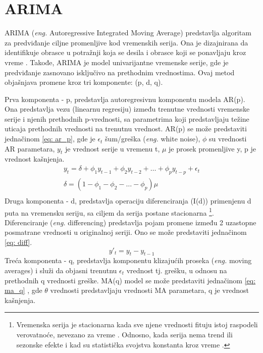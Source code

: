 \documentclass[12pt,oneside]{memoir}
\begin{document}
\section{ARIMA}
ARIMA (\textit{eng.} Autoregressive Integrated Moving Average) predstavlja algoritam za predviđanje ciljne promenljive kod vremenskih serija. Ona je dizajnirana da identifikuje obrasce u potražnji koja se desila i obrasce koji se ponavljaju kroz vreme \cite{mello2013demand}. Takođe, ARIMA je model univarijantne vremenske serije, gde je predviđanje zasnovano isključivo na prethodnim vrednostima. Ovaj metod objašnjava promene kroz tri komponente: (p, d, q). 

Prva komponenta - p, predstavlja autoregresivnu komponentu modela AR(p). Ona predstavlja vezu (linearnu regresiju) između trenutne vrednosti vremenske serije i njenih prethodnih p-vrednosti, sa parametrima koji predstavljaju težine uticaja prethodnih vrednosti na trenutnu vrednost. AR(p) se može predstaviti jednačinom \ref{eq: ar_p}, gde je $\epsilon_t$ šum/greška (\textit{eng.} white noise), $\phi$ su vrednosti AR parametara, $y_t$ je vrednost serije u vremenu t, $\mu$ je prosek promenljive y, p je vrednost kašnjenja.
\begin{equation}
\begin{gathered}
\label{eq: ar_p}
y_t = \delta + \phi_1y_{t-1} + \phi_2y_{t-2} + \dots + \phi_py_{t-p} + \epsilon_t \\
\delta = (1 - \phi_1 - \phi_2 - \dots - \phi_p)\mu \\
\end{gathered}
\end{equation}
Druga komponenta - d, predstavlja operaciju diferenciranja (I(d)) primenjenu d puta na vremensku seriju, sa ciljem da serija postane stacionarna \footnote{Vremenska serija je stacionarna kada sve njene vrednosti fituju istoj raspodeli verovatnoće, nevezano za vreme \cite{vargas2017automobile}. Odnosno, kada serija nema trend ili sezonske efekte i kad su statistička svojstva konstanta kroz vreme \cite{saravanan2019forecasting}.}. Diferenciranje (\textit{eng.} differencing) predstavlja pojam promene između 2 uzastopne posmatrane vrednosti u originalnoj seriji. Ono se može predstaviti jednačinom \ref{eq: diff}.
\begin{equation}
\label{eq: diff}
y'_t = y_t - y_{t-1}
\end{equation}
Treća komponenta - q, predstavlja komponentu klizajućih proseka (\textit{eng.} moving averages) i služi da objasni trenutnu $\epsilon_t$ vrednost tj. grešku, u odnosu na prethodnih q  vrednosti greške. MA(q) model se može predstaviti jednačinom \ref{eq: ma_q} \cite{vargas2017automobile}, gde $\theta$ vrednosti predstavljaju vrednosti MA parametara, q je vrednost kašnjenja.
\end{document}
